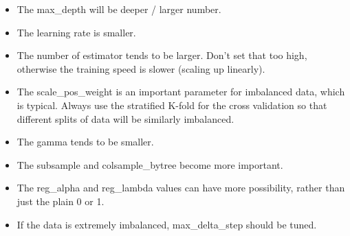 \documentclass[a4paper]{article}
\begin{document}
			\begin{itemize}
				\item The max\_depth will be deeper / larger number.
				\item The learning rate is smaller.
				\item The number of estimator tends to be larger. Don't set that too high, otherwise the training speed is slower (scaling up linearly).
				\item The scale\_pos\_weight is an important parameter for imbalanced data, which is typical. Always use the stratified K-fold for the cross validation so that different splits of data will be similarly imbalanced.
				\item The gamma tends to be smaller.
				\item The subsample and colsample\_bytree become more important.
				\item The reg\_alpha and reg\_lambda values can have more possibility, rather than just the plain 0 or 1.
				\item If the data is extremely imbalanced, max\_delta\_step should be tuned.
			\end{itemize}
			
\end{document}
